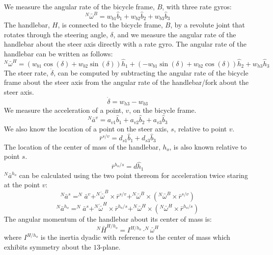 \documentclass[]{article}
\begin{document}
We measure the angular rate of the bicycle frame, $B$, with three rate gyros:
%
\begin{equation}
	^N\bar{\omega}^B = w_{b1}\hat{b}_1 + w_{b2}\hat{b}_2 + w_{b3}\hat{b}_3
\end{equation}
%
The handlebar, $H$, is connected to the bicycle frame, $B$, by a revolute joint
that rotates through the steering angle, $\delta$, and we measure the angular
rate of the handlebar about the steer axis directly with a rate gyro. The
angular rate of the handlebar can be written as follows:
%
\begin{equation}
	^N\bar{\omega}^H = (w_{b1}\cos(\delta) + w_{b2}\sin(\delta))\hat{h}_1 +
		(-w_{b1}\sin(\delta) + w_{b2}\cos(\delta))\hat{h}_2 + w_{h3}\hat{h}_3
\end{equation}
%
The steer rate, $\dot{\delta}$, can be computed by subtracting the angular rate
of the bicycle frame about the steer axis from the angular rate of the
handlebar/fork about the steer axis.
%
\begin{equation}
	\dot{\delta} = w_{h3} - w_{b3}
\end{equation}
%
We measure the acceleration of a point, $v$, on the bicycle frame.
%
\begin{equation}
	^N\bar{a}^v = a_{v1}\hat{b}_1 + a_{v2}\hat{b}_2 + a_{v3}\hat{b}_3
\end{equation}
%
We also know the location of a point on the steer axis, $s$, relative to point
$v$.
%
\begin{equation}
	\bar{r}^{s/v} = d_{s1}\hat{b}_1 + d_{s3}\hat{b}_3
\end{equation}
%
The location of the center of mass of the handlebar, $h_o$, is also known
relative to point $s$.
%
\begin{equation}
	\bar{r}^{h_o/s} = d\hat{h}_1
\end{equation}
%
$^N\bar{a}^{h_o}$ can be calculated using the two point thereom for
acceleration twice staring at the point $v$:
%
\begin{equation}
	^N\bar{a}^s = ^N\bar{a}^v + ^N\dot{\bar{\omega}}^B\times\bar{r}^{s/v} +
		^N\bar{\omega}^B\times(^N\bar{\omega}^B\times\bar{r}^{s/v})
\end{equation}
%
\begin{equation}
	^N\bar{a}^{h_o} = ^N\bar{a}^s + ^N\dot{\bar{\omega}}^H\times\bar{r}^{h_o/s} +
		^N\bar{\omega}^H\times(^N\bar{\omega}^H\times\bar{r}^{h_o/s})
\end{equation}
%
The angular momentum of the handlebar about its center of mass is:
%
\begin{equation}
	^N\bar{H}^{H/h_o} = I^{H/h_o} \cdot ^N\bar{\omega}^H
\end{equation}
%
where $I^{H/h_o}$ is the inertia dyadic with reference to the center of mass
which exhibits symmetry about the $13$-plane.
\end{document}
